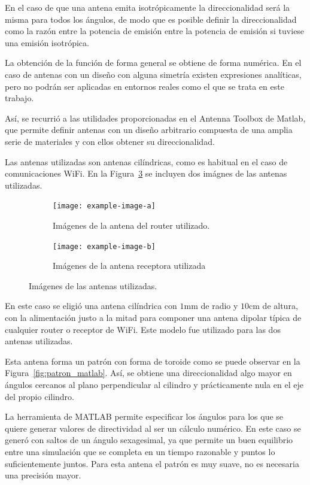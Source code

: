 En el caso de que una antena emita isotrópicamente la direccionalidad será la misma para todos los ángulos, de modo que es posible definir la direccionalidad como la razón entre la potencia de emisión entre la potencia de emisión si tuviese una emisión isotrópica.

La obtención de la función de forma general se obtiene de forma numérica.
En el caso de antenas con un diseño con alguna simetría existen expresiones analíticas, pero no podrán ser aplicadas en entornos reales como el que se trata en este trabajo.

Así, se recurrió a las utilidades proporcionadas en el Antenna Toolbox de Matlab, que permite definir antenas con un diseño arbitrario compuesta de una amplia serie de materiales y con ellos obtener su direccionalidad.

Las antenas utilizadas son antenas cilíndricas, como es habitual en el caso de comunicaciones WiFi.
En la Figura~\ref{fig:antenas} se incluyen dos imágnes de las antenas utilizadas.

\begin{figure}[H]
    \centering
    \begin{subfigure}[b]{0.4\textwidth}
        \centering
        \texttt{[image: example-image-a]}
        \caption{Imágenes de la antena del router utilizado.}
        \label{fig:antena_router}
    \end{subfigure}
    \begin{subfigure}[b]{0.4\textwidth}
        \centering
        \texttt{[image: example-image-b]} 
        \caption{Imágenes de la antena receptora utilizada}
        \label{fig:antena_receptor}
    \end{subfigure}
    \caption{Imágenes de las antenas utilizadas.}
    \label{fig:antenas}
\end{figure}

En este caso se eligió una antena cilíndrica con $1\si{\milli\meter}$ de radio y $10\si{\centi\meter}$ de altura, con la alimentación justo a la mitad para componer una antena dipolar típica de cualquier router o receptor de WiFi.
Este modelo fue utilizado para las dos antenas utilizadas.

Esta antena forma un patrón con forma de toroide como se puede observar en la Figura~\ref{fig:patron_matlab}.
Así, se obtiene una direccionalidad algo mayor en ángulos cercanos al plano perpendicular al cilindro y prácticamente nula en el eje del propio cilindro.

La herramienta de MATLAB permite especificar los ángulos para los que se quiere generar valores de directividad al ser un cálculo numérico.
En este caso se generó con saltos de un ángulo sexagesimal, ya que permite un buen equilibrio entre una simulación que se completa en un tiempo razonable y puntos lo suficientemente juntos.
Para esta antena el patrón es muy suave, no es necesaria una precisión mayor.

